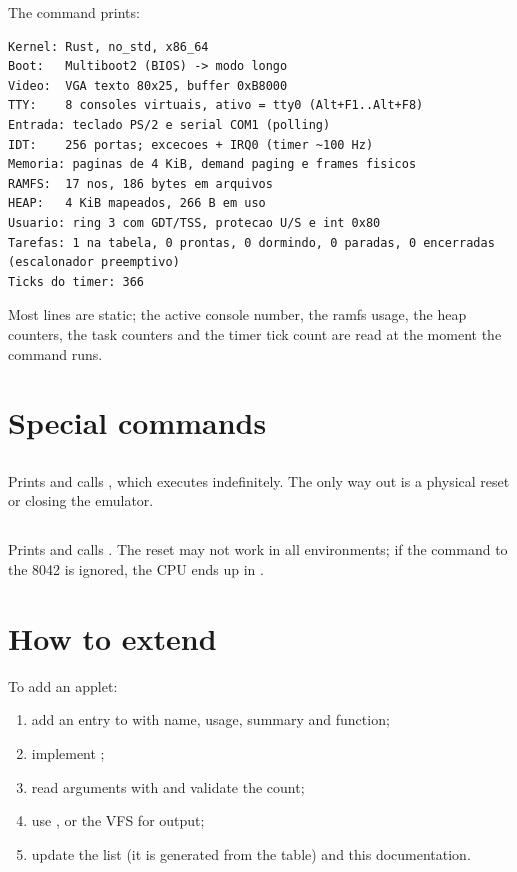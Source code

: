The  command prints:

\begin{lstlisting}[style=shell,caption={Output of the \code{info} command.},label={lst:info}]
Kernel: Rust, no_std, x86_64
Boot:   Multiboot2 (BIOS) -> modo longo
Video:  VGA texto 80x25, buffer 0xB8000
TTY:    8 consoles virtuais, ativo = tty0 (Alt+F1..Alt+F8)
Entrada: teclado PS/2 e serial COM1 (polling)
IDT:    256 portas; excecoes + IRQ0 (timer ~100 Hz)
Memoria: paginas de 4 KiB, demand paging e frames fisicos
RAMFS:  17 nos, 186 bytes em arquivos
HEAP:   4 KiB mapeados, 266 B em uso
Usuario: ring 3 com GDT/TSS, protecao U/S e int 0x80
Tarefas: 1 na tabela, 0 prontas, 0 dormindo, 0 paradas, 0 encerradas (escalonador preemptivo)
Ticks do timer: 366
\end{lstlisting}

Most lines are static; the active console number, the ramfs usage, the heap
counters, the task counters and the timer tick count are read at the moment
the command runs.

\section{Special commands}

\subsection{}

Prints  and calls
, which executes  indefinitely. The
only way out is a physical reset or closing the emulator.

\subsection{}

Prints  and calls . The reset may
not work in all environments; if the command to the 8042 is ignored, the CPU
ends up in .

\section{How to extend}

To add an applet:

\begin{enumerate}
  \item add an  entry to  with name, usage, summary
        and function;
  \item implement ;
  \item read arguments with  and validate the count;
  \item use ,  or the VFS for output;
  \item update the  list (it is generated from the table) and this
        documentation.
\end{enumerate}


